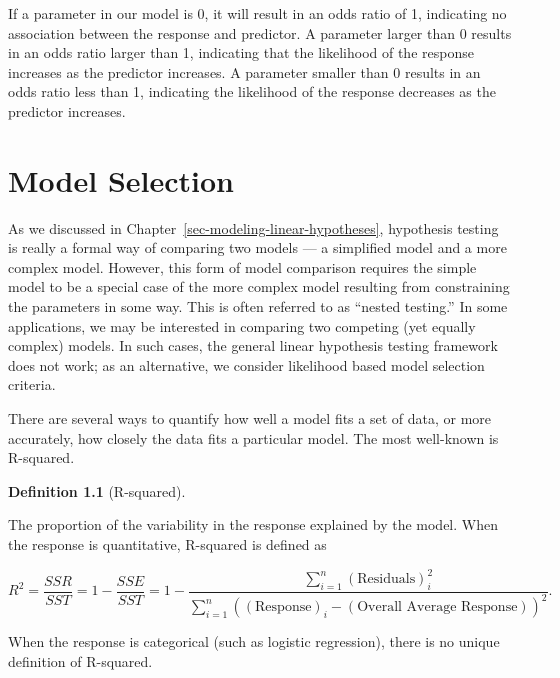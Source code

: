 \documentclass[
  letterpaper,
  DIV=11,
  numbers=noendperiod]{scrreprt}
\theoremstyle{definition}
\newtheorem{definition}{Definition}[chapter]
\theoremstyle{definition}
\theoremstyle{remark}
\begin{document}
If a parameter in our model is 0, it will result in an odds ratio of 1,
indicating no association between the response and predictor. A
parameter larger than 0 results in an odds ratio larger than 1,
indicating that the likelihood of the response increases as the
predictor increases. A parameter smaller than 0 results in an odds ratio
less than 1, indicating the likelihood of the response decreases as the
predictor increases.

\hypertarget{sec-nlm-selection}{%
\chapter{Model Selection}\label{sec-nlm-selection}}

\providecommand{\norm}[1]{\left\lVert#1\right\rVert}
\providecommand{\abs}[1]{\left\lvert#1\right\rvert}
\providecommand{\dist}[1]{\stackrel{\text{#1}}{\sim}}
\providecommand{\ind}[1]{\mathbb{I}\left(#1\right)}
\providecommand{\bm}[1]{\mathbf{#1}}
\providecommand{\bs}[1]{\boldsymbol{#1}}
\providecommand{\Ell}{\mathcal{L}}
\providecommand{\indep}{\perp\negthickspace\negmedspace\perp}

As we discussed in Chapter~\ref{sec-modeling-linear-hypotheses},
hypothesis testing is really a formal way of comparing two models --- a
simplified model and a more complex model. However, this form of model
comparison requires the simple model to be a special case of the more
complex model resulting from constraining the parameters in some way.
This is often referred to as ``nested testing.'' In some applications,
we may be interested in comparing two competing (yet equally complex)
models. In such cases, the general linear hypothesis testing framework
does not work; as an alternative, we consider likelihood based model
selection criteria.

There are several ways to quantify how well a model fits a set of data,
or more accurately, how closely the data fits a particular model. The
most well-known is R-squared.

\begin{definition}[R-squared]\protect\hypertarget{def-r-squared}{}\label{def-r-squared}

The proportion of the variability in the response explained by the
model. When the response is quantitative, R-squared is defined as

\[R^2 = \frac{SSR}{SST} = 1 - \frac{SSE}{SST} = 1 - \frac{\sum_{i=1}^{n} (\text{Residuals})_i^2}{\sum_{i=1}^{n} \left((\text{Response})_i - (\text{Overall Average Response})\right)^2}.\]

When the response is categorical (such as logistic regression), there is
no unique definition of R-squared.

\end{definition}
\end{document}
